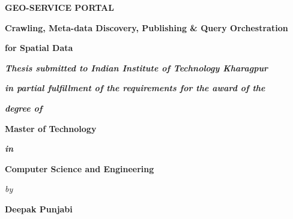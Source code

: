 \thispagestyle{empty}
\begin{center}
\textbf{ GEO-SERVICE PORTAL }
\end{center}
 \vspace{-2.5em}
\begin{center}
\textbf{Crawling, Meta-data Discovery, Publishing \& Query Orchestration}
\end{center}
 \vspace{-2.5em}
\begin{center}
\textbf{ for Spatial Data }
\end{center}
 \vspace{2em}
\begin{center}
 \textbf{\textit{Thesis submitted to Indian Institute of Technology Kharagpur}} 
\end{center}
 \vspace{-3em}
\begin{center}
 \textbf{\textit{in partial fulfillment of the requirements for the award of the }} 
\end{center}
 \vspace{-3em}
\begin{center}
 \textbf{\textit{degree of}}
\end{center}
 \vspace{-1em}
\begin{center}
 \textbf{ Master of Technology}
\end{center}
\vspace{-3em}
\begin{center}
 \textbf{\textit{in}}
\end{center}
 \vspace{-3em}
\begin{center}
 \textbf{{Computer Science and Engineering}}
\end{center}
 \vspace{-3em}
\begin{center}
 \textit{by}
\end{center}
 \vspace{-1em}
\begin{center}
 \large{\textbf{Deepak Punjabi}}
\end{center}
